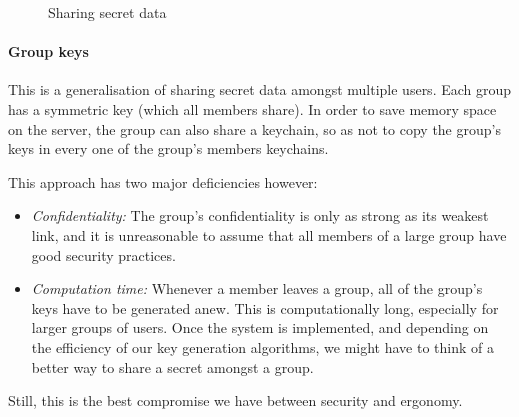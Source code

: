 \documentclass[a4paper, english]{report}
\begin{document}
\begin{figure}[!h]
\centering
{}
\label{sharing_secret_data}
\caption{Sharing secret data}
\end{figure}

\paragraph{Group keys}
This is a generalisation of sharing secret data amongst multiple users. Each group has a symmetric key (which all members share). In order to save memory space on the server, the group can also share a keychain, so as not to copy the group's keys in every one of the group's members keychains.

This approach has two major deficiencies however:
\begin{itemize}
\item \emph{Confidentiality:} The group's confidentiality is only as strong as its weakest link, and it is unreasonable to assume that all members of a large group have good security practices.
\item \emph{Computation time:} Whenever a member leaves a group, all of the group's keys have to be generated anew. This is computationally long, especially for larger groups of users. Once the system is implemented, and depending on the efficiency of our key generation algorithms, we might have to think of a better way to share a secret amongst a group.
\end{itemize}
Still, this is the best compromise we have between security and ergonomy.
\end{document}
